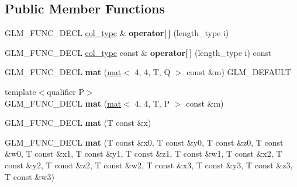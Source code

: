 \subsection*{Public Member Functions}
\begin{DoxyCompactItemize}
\item 
\mbox{\label{structglm_1_1mat_3_014_00_014_00_01T_00_01Q_01_4_a45140ed8c7f6d53ed8fa2ddc04ac1bb2}} 
G\+L\+M\+\_\+\+F\+U\+N\+C\+\_\+\+D\+E\+CL \hyperlink{structglm_1_1vec_3_014_00_01T_00_01Q_01_4}{col\+\_\+type} \& {\bfseries operator\mbox{[}$\,$\mbox{]}} (length\+\_\+type i)
\item 
\mbox{\label{structglm_1_1mat_3_014_00_014_00_01T_00_01Q_01_4_a03fe2789c5b3555f79883dae649167f4}} 
G\+L\+M\+\_\+\+F\+U\+N\+C\+\_\+\+D\+E\+CL \hyperlink{structglm_1_1vec_3_014_00_01T_00_01Q_01_4}{col\+\_\+type} const  \& {\bfseries operator\mbox{[}$\,$\mbox{]}} (length\+\_\+type i) const
\item 
\mbox{\label{structglm_1_1mat_3_014_00_014_00_01T_00_01Q_01_4_a44584be3e9fce39b0bd68be88b5796e0}} 
G\+L\+M\+\_\+\+F\+U\+N\+C\+\_\+\+D\+E\+CL {\bfseries mat} (\hyperlink{structglm_1_1mat}{mat}$<$ 4, 4, T, Q $>$ const \&m) G\+L\+M\+\_\+\+D\+E\+F\+A\+U\+LT
\item 
\mbox{\label{structglm_1_1mat_3_014_00_014_00_01T_00_01Q_01_4_a80b0fa8ea9699d9ad249de2025dd6246}} 
{\footnotesize template$<$qualifier P$>$ }\\G\+L\+M\+\_\+\+F\+U\+N\+C\+\_\+\+D\+E\+CL {\bfseries mat} (\hyperlink{structglm_1_1mat}{mat}$<$ 4, 4, T, P $>$ const \&m)
\item 
\mbox{\label{structglm_1_1mat_3_014_00_014_00_01T_00_01Q_01_4_aabb2b453a9f1ab39f248c1ee50536fec}} 
G\+L\+M\+\_\+\+F\+U\+N\+C\+\_\+\+D\+E\+CL {\bfseries mat} (T const \&x)
\item 
\mbox{\label{structglm_1_1mat_3_014_00_014_00_01T_00_01Q_01_4_af99e36d9f8de18d3e3d36f48a16c0910}} 
G\+L\+M\+\_\+\+F\+U\+N\+C\+\_\+\+D\+E\+CL {\bfseries mat} (T const \&x0, T const \&y0, T const \&z0, T const \&w0, T const \&x1, T const \&y1, T const \&z1, T const \&w1, T const \&x2, T const \&y2, T const \&z2, T const \&w2, T const \&x3, T const \&y3, T const \&z3, T const \&w3)

\end{DoxyCompactItemize}
